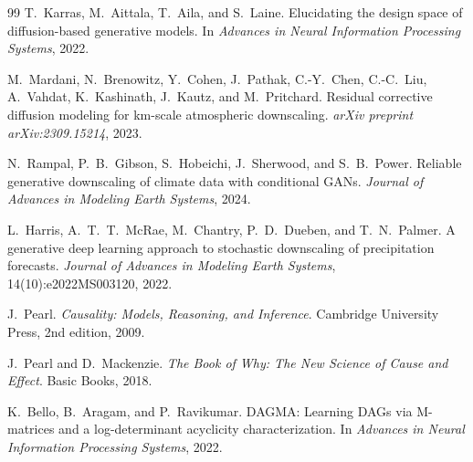 \documentclass[14pt,a4paper,openany]{extreport}
\begin{document}
\begin{thebibliography}{99}
 T.~Karras, M.~Aittala, T.~Aila, and S.~Laine. Elucidating the design space of diffusion-based generative models. In \emph{Advances in Neural Information Processing Systems}, 2022.

 M.~Mardani, N.~Brenowitz, Y.~Cohen, J.~Pathak, C.-Y.~Chen, C.-C.~Liu, A.~Vahdat, K.~Kashinath, J.~Kautz, and M.~Pritchard. Residual corrective diffusion modeling for km-scale atmospheric downscaling. \emph{arXiv preprint arXiv:2309.15214}, 2023.

 N.~Rampal, P.~B.~Gibson, S.~Hobeichi, J.~Sherwood, and S.~B.~Power. Reliable generative downscaling of climate data with conditional GANs. \emph{Journal of Advances in Modeling Earth Systems}, 2024.

 L.~Harris, A.~T.~T.~McRae, M.~Chantry, P.~D.~Dueben, and T.~N.~Palmer. A generative deep learning approach to stochastic downscaling of precipitation forecasts. \emph{Journal of Advances in Modeling Earth Systems}, 14(10):e2022MS003120, 2022.

 J.~Pearl. \emph{Causality: Models, Reasoning, and Inference}. Cambridge University Press, 2nd edition, 2009.

 J.~Pearl and D.~Mackenzie. \emph{The Book of Why: The New Science of Cause and Effect}. Basic Books, 2018.

 K.~Bello, B.~Aragam, and P.~Ravikumar. DAGMA: Learning DAGs via M-matrices and a log-determinant acyclicity characterization. In \emph{Advances in Neural Information Processing Systems}, 2022.

\end{thebibliography}
\end{document}
